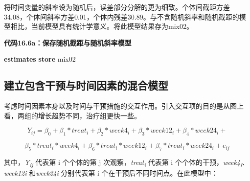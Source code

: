 \documentclass[
  chinese-hans,
  letterpaper,
  DIV=11,
  numbers=noendperiod]{scrreprt}
\newenvironment{Shaded}{\begin{snugshade}}{\end{snugshade}}
\newcommand{\KeywordTok}[1]{\textcolor[rgb]{0.00,0.23,0.31}{\textbf{#1}}}
\newcommand{\NormalTok}[1]{\textcolor[rgb]{0.00,0.23,0.31}{#1}}
\begin{document}
将时间变量的斜率设为随机后，误差部分分解的更为细致。个体间截距方差34.08，个体间斜率方差0.01，个体内残差30.89。与不含随机斜率和随机截距的模型相比，当前模型具有统计学意义。将此模型结果存为mix02。

\begin{tcolorbox}[enhanced jigsaw, arc=.35mm, bottomrule=.15mm, breakable, colback=white, colframe=quarto-callout-note-color-frame, left=2mm, leftrule=.75mm, opacityback=0, rightrule=.15mm, toprule=.15mm]

\vspace{-3mm}\textbf{代码16.6a：保存随机截距与随机斜率模型}\vspace{3mm}

\begin{Shaded}
\begin{Highlighting}[]
\KeywordTok{estimates} \KeywordTok{store}\NormalTok{ mix02}
\end{Highlighting}
\end{Shaded}

\end{tcolorbox}

\subsection{建立包含干预与时间因素的混合模型}\label{ux5efaux7acbux5305ux542bux5e72ux9884ux4e0eux65f6ux95f4ux56e0ux7d20ux7684ux6df7ux5408ux6a21ux578b}

考虑时间因素本身以及时间与干预措施的交互作用。引入交互项的目的是从图上看，两组的增长趋势不同，治疗组更快一些。

\[Y_{ij} = \beta_{0} + \beta_{1}*{treat}_{i} + \beta_{2}*{week4}_{i} + \beta_{3}*{week12}_{i} + \beta_{4}*{week24}_{i} +\]

\[\beta_{5}*{treat}_{i}*{week4}_{i} + \beta_{6}*{treat}_{i}*{week12}_{i} + \beta_{7}*{treat}_{i}*{week24}_{i} + e_{ij}\]

其中，\emph{Y\textsubscript{ij}} 代表第 i 个个体的第 j
次观察，\emph{treat\textsubscript{i}} 代表第 i
个个体的干预，\emph{week4\textsubscript{i}}、\emph{week12i}
和\emph{week24i} 分别代表第 i 个在干预后不同时间点。在此模型中：
\end{document}
